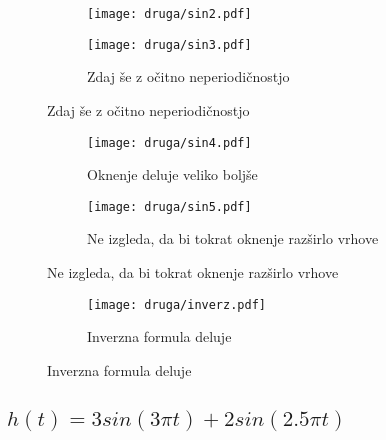 \documentclass{article}
\begin{document}
\begin{figure}[H]
\begin{subfigure}{.5\textwidth}
\texttt{[image: druga/sin2.pdf]}
\end{subfigure}
\begin{subfigure}{.5\textwidth}
\texttt{[image: druga/sin3.pdf]}
\caption*{Zdaj še z očitno neperiodičnostjo}
\end{subfigure}
\end{figure}
\begin{figure}[H]
\begin{subfigure}{.5\textwidth}
\texttt{[image: druga/sin4.pdf]}
\caption*{Oknenje deluje veliko boljše}
\end{subfigure}
\begin{subfigure}{.5\textwidth}
\texttt{[image: druga/sin5.pdf]}
\caption*{Ne izgleda, da bi tokrat oknenje razširlo vrhove}
\end{subfigure}
\end{figure}
\begin{figure}[H]
\centering
\begin{subfigure}{.5\textwidth}
\texttt{[image: druga/inverz.pdf]}
\caption*{Inverzna formula deluje}
\end{subfigure}
\end{figure}

\subsection{$h(t)=3sin(3\pi t) + 2sin(2.5 \pi t)$}
\end{document}
